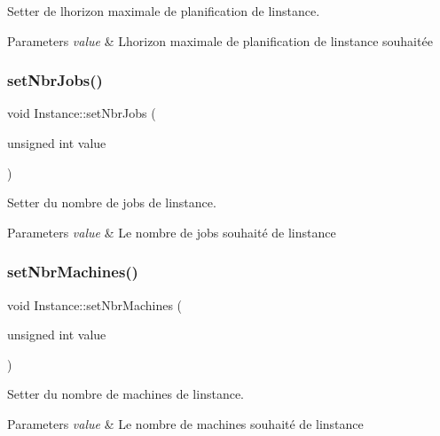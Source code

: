 Setter de l\textquotesingle{}horizon maximale de planification de l\textquotesingle{}instance. 


\begin{DoxyParams}{Parameters}
{\em value} & L\textquotesingle{}horizon maximale de planification de l\textquotesingle{}instance souhaitée \\
\hline
\end{DoxyParams}
\mbox{\label{classInstance_ade6c7b12ee34960cebb060d669ec8f06}} 
\subsubsection{\texorpdfstring{set\+Nbr\+Jobs()}{setNbrJobs()}}
{\footnotesize\ttfamily void Instance\+::set\+Nbr\+Jobs (\begin{DoxyParamCaption}\item[{unsigned int}]{value }\end{DoxyParamCaption})}



Setter du nombre de jobs de l\textquotesingle{}instance. 


\begin{DoxyParams}{Parameters}
{\em value} & Le nombre de jobs souhaité de l\textquotesingle{}instance \\
\hline
\end{DoxyParams}
\mbox{\label{classInstance_a7087e8d1d2a5a4d275472dc908a06381}} 
\subsubsection{\texorpdfstring{set\+Nbr\+Machines()}{setNbrMachines()}}
{\footnotesize\ttfamily void Instance\+::set\+Nbr\+Machines (\begin{DoxyParamCaption}\item[{unsigned int}]{value }\end{DoxyParamCaption})}



Setter du nombre de machines de l\textquotesingle{}instance. 


\begin{DoxyParams}{Parameters}
{\em value} & Le nombre de machines souhaité de l\textquotesingle{}instance \\
\hline
\end{DoxyParams}
\mbox{\label{classInstance_aefc2e4c0a18ad899f99cad856a749358}} 
